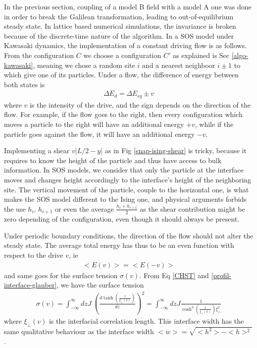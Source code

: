 In the previous section, coupling of a model B field with a model A one was done in order to break the Galilean transformation, leading to out-of-equilibrium steady state. In lattice based numerical simulations, the invariance is broken because of the discrete-time nature of the algorithm.
In a SOS model under Kawasaki dynamics, the implementation of a constant driving flow is as follows. From the configuration $C$ we choose a configuration $C'$ as explained is Sec \ref{algo-kawasaki}, meaning we chose a random site $i$ and a nearest neighboor $i\pm1 $ to which give one of its particles. Under a flow, the difference of energy between both states is
\begin{align}
\Delta E_d = \Delta E_{eq} \pm v
\end{align}
where $v$ is the intensity of the drive, and the sign depends on the direction of the flow. For example, if the flow goes to the right, then every configuration which moves a particle to the right will have an additional energy $+v$, while if the particle goes against the flow, it will have an additional energy $-v$.

Implementing a shear $v |L/2-y|$ as in Fig \ref{snap-ising-shear} is tricky, because it requires to know the height of the particle and thus have access to bulk information. In SOS models, we consider that only the particle at the interface moves and changes height accordingly to the interface's height of the neighboring site. The vertical movement of the particle, couple to the horizontal one, is what makes the SOS model different to the Ising one, and physical arguments forbids the use $h_i$, $h_{i+1}$ or even the average $\frac{h_i+h_{i+1}}{2}$ as the shear contribution might be zero depending of the configuration, even though it should always be present. 

Under periodic boundary conditions, the direction of the flow should not alter the steady state. The average total energy has thus to be an even function with respect to the drive $v$, ie
\begin{align}
    <E(v)> = <E(-v)>
\end{align}
and same goes for the surface tension $\sigma(v)$.
From Eq \eqref{CHST} and \eqref{profil-interface-glauber}, we have the surface tension
\begin{align}
    \sigma(v) = \int_{-\infty}^{\infty} dz J\  \left( \frac{d \tanh \left(\frac{z}{\xi_\perp(v)} \right)}{dz} \right)^2 = \int_{-\infty}^{\infty} dz  J \frac{1}{\cosh^4(\frac{x}{\xi_\perp(v)}) \xi_\perp^2}
    \label{int-sigma}
\end{align}
where $\xi_\perp(v)$ is the interfacial correlation length. This interface width has the same qualitative behaviour as the interface width $<w> = \sqrt{<h^2>-<h>^2}$. 

